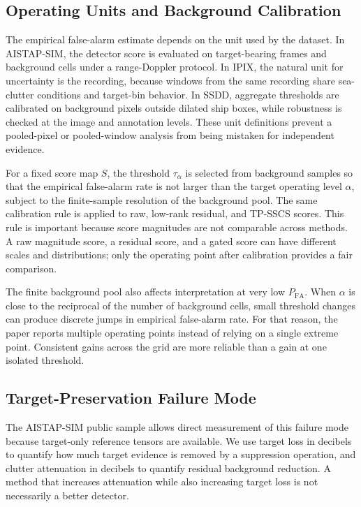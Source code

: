 \documentclass[journal]{IEEEtran}
\begin{document}
\subsection{Operating Units and Background Calibration}

The empirical false-alarm estimate depends on the unit used by the dataset. In AISTAP-SIM, the detector score is evaluated on target-bearing frames and background cells under a range-Doppler protocol. In IPIX, the natural unit for uncertainty is the recording, because windows from the same recording share sea-clutter conditions and target-bin behavior. In SSDD, aggregate thresholds are calibrated on background pixels outside dilated ship boxes, while robustness is checked at the image and annotation levels. These unit definitions prevent a pooled-pixel or pooled-window analysis from being mistaken for independent evidence.

For a fixed score map $S$, the threshold $\tau_\alpha$ is selected from background samples so that the empirical false-alarm rate is not larger than the target operating level $\alpha$, subject to the finite-sample resolution of the background pool. The same calibration rule is applied to raw, low-rank residual, and TP-SSCS scores. This rule is important because score magnitudes are not comparable across methods. A raw magnitude score, a residual score, and a gated score can have different scales and distributions; only the operating point after calibration provides a fair comparison.

The finite background pool also affects interpretation at very low $P_{\mathrm{FA}}$. When $\alpha$ is close to the reciprocal of the number of background cells, small threshold changes can produce discrete jumps in empirical false-alarm rate. For that reason, the paper reports multiple operating points instead of relying on a single extreme point. Consistent gains across the grid are more reliable than a gain at one isolated threshold.

\subsection{Target-Preservation Failure Mode}

The AISTAP-SIM public sample allows direct measurement of this failure mode because target-only reference tensors are available. We use target loss in decibels to quantify how much target evidence is removed by a suppression operation, and clutter attenuation in decibels to quantify residual background reduction. A method that increases attenuation while also increasing target loss is not necessarily a better detector.
\end{document}
